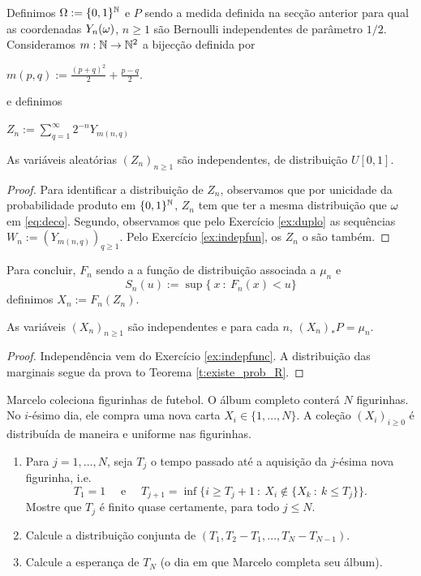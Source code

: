 \medskip

Definimos $\Omega:=\{0,1\}^{{\mathbb N}}$ e $P$ sendo a medida definida na secção anterior para qual
as coordenadas $Y_n(\omega)$, $n\ge 1$  são Bernoulli independentes de parâmetro $1/2$.
Consideramos $m: {\mathbb N}\to {\ensuremath{\mathbb N}}^2$ a bijecção definida por

$m(p,q):= \frac{(p+q)^2}{2}+\frac{p-q}{2}.$

e definimos

$Z_n:=\sum_{q=1}^{\infty} 2^{-n} Y_{m(n,q)} $

\begin{lemma}
As variáveis aleatórias $(Z_n)_{n\ge 1}$ são independentes, de distribuição $U[0,1]$.
\end{lemma}

 \begin{proof}
Para identificar a distribuição de $Z_n$, observamos que por unicidade da probabilidade produto em $\{0,1\}^{{\mathbb N}}$, $Z_n$ tem que ter a mesma distribuição que
$\omega$ em \eqref{eq:deco}.
Segundo, observamos que pelo Exercício \ref{ex:duplo} as sequências $W_n:=(Y_{m(n,q)})_{q\ge 1}$.
Pelo Exercício \ref{ex:indepfun}, os $Z_n$ o são também.
\end{proof}


Para concluir, $F_n$ sendo a a função de distribuição associada a $\mu_n$ e
$$S_n(u):=\sup\{\ x  \ : \ F_n(x)<u \}$$
definimos $X_n:=F_n(Z_n)$.

\begin{proposition}
 As variáveis $(X_n)_{n\ge 1}$ são independentes e
 para cada $n$, $(X_n)_* P=\mu_n$.
 \end{proposition}

 \begin{proof}
  Independência vem do Exercício \ref{ex:indepfunc}. A distribuição das marginais segue da prova to Teorema \ref{t:existe_prob_R}.

 \end{proof}



\begin{exercise}
  Marcelo coleciona figurinhas de futebol.
  O álbum completo conter\'a $N$ figurinhas. No $i$-ésimo dia, ele compra uma nova carta $X_i \in \{1, \dots, N\}$.
  A cole\c{c}\~ao $(X_i)_{i \geq 0}$ é distribuída de maneira \iid e uniforme nas figurinhas.
  \begin{enumerate}[\quad a)]
  \item Para $j = 1, \dots, N$, seja $T_j$ o tempo passado até a aquisi\c{c}\~ao da $j$-ésima nova figurinha, i.e.
    \begin{equation}
      T_1 = 1 \quad \text{ e } \quad T_{j+1} = \inf\{i\ge T_{j}+1 \ : \  X_i\notin \{X_k\ : \ k\le T_j\} \}.
    \end{equation}
    Mostre que $T_j$ é finito quase certamente, para todo $j \leq N$.
  \item Calcule a distribuição conjunta de $(T_1, T_2 - T_1, \dots, T_N - T_{N-1})$.
  \item Calcule a esperança de $T_N$ (o dia em que Marcelo completa seu álbum).
  \end{enumerate}
\end{exercise}

